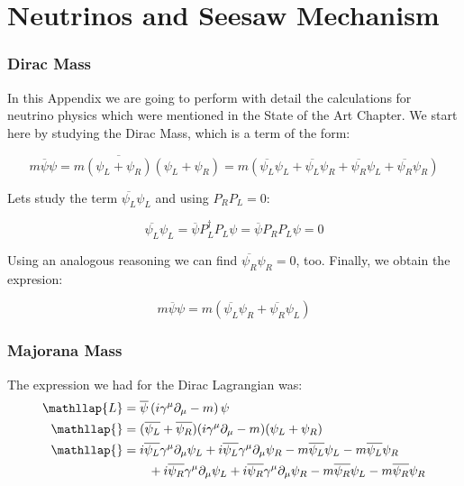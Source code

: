 \chapter{Neutrinos and Seesaw Mechanism} \label{apendice_neutrinos}


\subsection{Dirac Mass}
In this Appendix we are going to perform with detail the calculations for neutrino physics which were mentioned in the State of the Art Chapter. 
We start here by studying the Dirac Mass, which is a term of the form:

\begin{equation}
 m \overline{\psi} \psi = m \overline{(\psi_L + \psi_R)} (\psi_L + \psi_R) = m(\overline{\psi_L} \psi_L + \overline{\psi_L}\psi_R + \overline{\psi_R}\psi_L + \overline{\psi_R} \psi_R)
\end{equation}

Lets study the term $\overline{\psi_L}\psi_L$ and using $P_R  P_L = 0$:

\begin{equation}
 \overline{\psi_L}\psi_L = \overline{\psi} {P}^{\dagger}_L P_L \psi = \overline{\psi}P_R  P_L \psi = 0
\end{equation}

Using an analogous reasoning we can find $\overline{\psi_R}\psi_R = 0$, too. Finally, we obtain the expresion:

\begin{equation}
  m \overline{\psi} \psi = m (\overline{\psi_L} \psi_R + \overline{\psi_R}\psi_L)
\end{equation}

\subsection{Majorana Mass}

The expression we had for the Dirac Lagrangian was: 
\begin{align}
  &\begin{aligned}
    \mathllap{L} &= \overline{\psi} \left( i \gamma ^\mu \partial_{\mu} - m \right) \psi \\
    \mathllap{}  &= (\overline{\psi_L} + \overline{\psi_R})( i \gamma ^\mu \partial_{\mu} - m)(\psi_L + \psi_R) \\
    \mathllap{}  &= i \overline{\psi_L} \gamma ^\mu \partial_{\mu} \psi_L + i \overline{\psi_L} \gamma ^\mu   \partial_{\mu} \psi_R - m \overline{\psi_L} \psi_L - m \overline{\psi_L} \psi_R \\
  &\qquad + i \overline{\psi_R} \gamma ^\mu \partial_{\mu} \psi_L + i \overline{\psi_R} \gamma^{\mu} \partial_{\mu} \psi_R - m \overline{\psi_R} \psi_L - m \overline{\psi_R} \psi_R \\
  \end{aligned}\\
\end{align}

